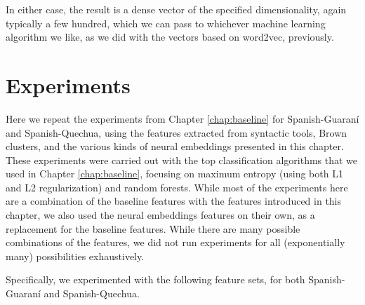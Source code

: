 In either case, the result is a dense vector of the specified dimensionality,
again typically a few hundred, which we can pass to whichever machine learning
algorithm we like, as we did with the vectors based on word2vec, previously.

\section{Experiments}
\label{sec:monolingual-experiments}
Here we repeat the experiments from Chapter \ref{chap:baseline} for
Spanish-Guaraní and Spanish-Quechua, using the features extracted from
syntactic tools, Brown clusters, and the various kinds of neural embeddings
presented in this chapter.
These experiments were carried out with the top classification algorithms that
we used in Chapter \ref{chap:baseline}, focusing on maximum entropy (using both
L1 and L2 regularization) and random forests. While most of the experiments
here are a combination of the baseline features with the features introduced in
this chapter, we also used the neural embeddings features on their own,
as a replacement for the baseline features. While there are many possible
combinations of the features, we did not run experiments for all (exponentially
many) possibilities exhaustively.

Specifically, we experimented with the following feature sets, for both
Spanish-Guaraní and Spanish-Quechua.

